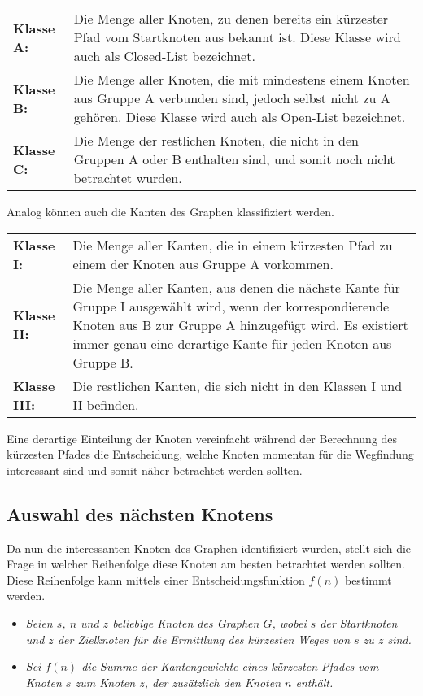 		\begin{longtable}{p{2.5cm} p{10cm}}	
			\textbf{Klasse A:} & Die Menge aller Knoten, zu denen bereits ein kürzester Pfad  vom Startknoten aus bekannt ist. Diese Klasse wird auch als Closed-List bezeichnet.\\[0.25cm]
			\textbf{Klasse B:} & Die Menge aller Knoten, die mit mindestens einem Knoten aus Gruppe A verbunden sind, jedoch selbst nicht zu A gehören. Diese Klasse wird auch als Open-List bezeichnet.\\[0.25cm]
			\textbf{Klasse C:} & Die Menge der restlichen Knoten, die nicht in den Gruppen A oder B enthalten sind, und somit noch nicht betrachtet wurden.\\[0.25cm]
		\end{longtable}
		
		Analog können auch die Kanten des Graphen klassifiziert werden.
	
		\begin{longtable}{p{2.5cm} p{10cm}}
			\textbf{Klasse I:} & Die Menge aller Kanten, die in einem kürzesten Pfad zu einem der Knoten aus Gruppe A vorkommen.\\[0.25cm]
			\textbf{Klasse II:} & Die Menge aller Kanten, aus denen die nächste Kante für Gruppe I ausgewählt wird, wenn der korrespondierende Knoten aus B zur Gruppe A hinzugefügt wird. Es existiert immer genau eine derartige Kante für jeden Knoten aus Gruppe B. \\[0.25cm]
			\textbf{Klasse III:} & Die restlichen Kanten, die sich nicht in den Klassen I und II befinden.\\[0.25cm]
		\end{longtable}
		
		Eine derartige Einteilung der Knoten vereinfacht während der Berechnung des kürzesten Pfades die Entscheidung, welche Knoten momentan für die Wegfindung interessant sind und somit näher betrachtet werden sollten.
		
	\subsection{Auswahl des nächsten Knotens}
		\label{Abschaetz}
		Da nun die interessanten Knoten des Graphen identifiziert wurden, stellt sich die Frage in welcher Reihenfolge diese Knoten am besten betrachtet werden sollten.
		Diese Reihenfolge kann mittels einer Entscheidungsfunktion $f(n)$ bestimmt werden.
		
		\begin{itemize}
			\item \textit{Seien $s$, $n$ und $z$ beliebige Knoten des Graphen $G$, wobei $s$ der Startknoten und $z$ der Zielknoten für die Ermittlung des kürzesten Weges von $s$ zu $z$ sind.}\\
			\item \textit{Sei $f(n)$ die Summe der Kantengewichte eines kürzesten Pfades vom Knoten $s$ zum Knoten $z$, der zusätzlich den Knoten $n$ enthält.}
		\end{itemize}
		
